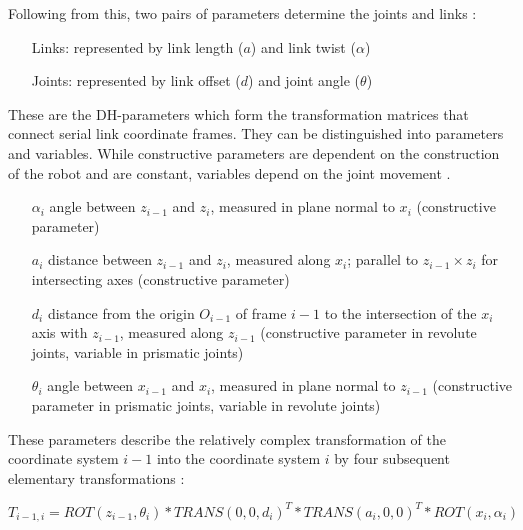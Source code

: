 Following from this, two pairs of parameters determine the joints and links \cite{ConstantinForwardKA}:
\begin{itemize}[wide=\parindent] 
	\item[Links:] represented by link length ($a$) and link twist ($\alpha$)
	\item[Joints:] represented by link offset ($d$)
	and joint angle ($\theta$) 
\end{itemize}

These are the \ac{DH}-parameters which form the transformation matrices that connect serial link coordinate frames. They can be distinguished into parameters and variables. While constructive parameters are dependent on the construction of the robot and are constant, variables depend on the joint movement \cite{FwdInvAnalysRobManip} \cite{ConstantinForwardKA} \cite{DenavitHartenbergKonventionen}.

\begin{enumerate}[label=\emph{\arabic*)}]
	\item[$\alpha_i$] angle between $z_{i-1}$ and $z_i$, measured in plane normal to $x_i$ (constructive parameter)
	\item[$a_i$] distance between $z_{i-1}$ and $z_i$, measured along $x_i$; parallel to $z_{i-1} \times z_i$ for intersecting axes (constructive parameter)
	\item[$d_i$] distance from the origin $O_{i-1}$ of frame $i-1$ to the intersection of the $x_i$ axis with $z_{i-1}$, measured along $z_{i-1}$ (constructive parameter in revolute joints, variable in prismatic joints)
	\item[$\theta_i$] angle between $x_{i-1}$ and $x_i$, measured in plane normal to $z_{i-1}$ (constructive parameter in prismatic joints, variable in revolute joints)
\end{enumerate}

These parameters describe the relatively complex transformation of the coordinate system $i-1$ into the coordinate system $i$ by four subsequent elementary transformations \cite{allgInvKin}:

\begin{equation} \label{eq:DH-Transform}
	T_{i-1,i}=ROT(z_{i-1}, \theta_i) * TRANS(0,0,d_i)^T * TRANS(a_i,0,0)^T * ROT(x_i,\alpha_i)
\end{equation}

